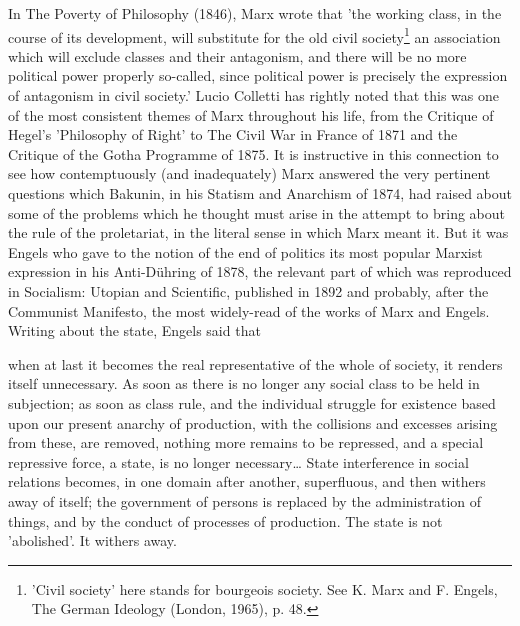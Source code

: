 In The Poverty of Philosophy (1846), Marx wrote that 'the working class, in the course of its development, will substitute for the old civil society\footnote{'Civil society' here stands for bourgeois society. See K. Marx and F. Engels, The German Ideology (London, 1965), p. 48.} an association which will exclude classes and their antagonism, and there will be no more political power properly so-called, since political power is precisely the expression of antagonism in civil society.' Lucio Colletti has rightly noted that this was one of the most consistent themes of Marx throughout his life, from the Critique of Hegel's 'Philosophy of Right' to The Civil War in France of 1871 and the Critique of the Gotha Programme of 1875. It is instructive in this connection to see how contemptuously (and inadequately) Marx answered the very pertinent questions which Bakunin, in his Statism and Anarchism of 1874, had raised about some of the problems which he thought must arise in the attempt to bring about the rule of the proletariat, in the literal sense in which Marx meant it. But it was Engels who gave to the notion of the end of politics its most popular Marxist expression in his Anti\hyp{}Dühring of 1878, the relevant part of which was reproduced in Socialism: Utopian and Scientific, published in 1892 and probably, after the Communist Manifesto, the most widely-read of the works of Marx and Engels. Writing about the state, Engels said that
\begin{displayquote}
    when at last it becomes the real representative of the whole of society, it renders itself unnecessary. As soon as there is no longer any social class to be held in subjection; as soon as class rule, and the individual struggle for existence based upon our present anarchy of production, with the collisions and excesses arising from these, are removed, nothing more remains to be repressed, and a special repressive force, a state, is no longer necessary\dots{} State interference in social relations becomes, in one domain after another, superfluous, and then withers away of itself; the government of persons is replaced by the administration of things, and by the conduct of processes of production. The state is not 'abolished'. It withers away.
\end{displayquote}

